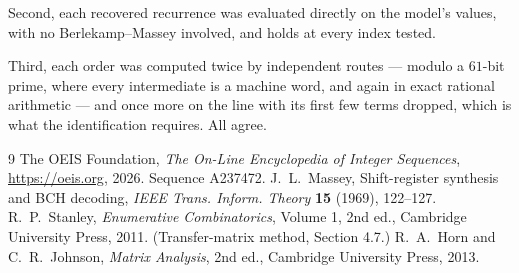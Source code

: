 \documentclass[11pt,a4paper]{article}
\theoremstyle{plain}
\theoremstyle{definition}
\begin{document}
Second, each recovered recurrence was evaluated directly on the model's values, with no
Berlekamp--Massey involved, and holds at every index tested.

Third, each order was computed twice by independent routes --- modulo a $61$-bit prime, where
every intermediate is a machine word, and again in exact rational arithmetic --- and once more
on the line with its first few terms dropped, which is what the identification requires. All
agree.

\begin{thebibliography}{9}
 The OEIS Foundation, \emph{The On-Line Encyclopedia of Integer
Sequences}, \url{https://oeis.org}, 2026. Sequence A237472.
 J.~L.~Massey, Shift-register synthesis and BCH decoding, \emph{IEEE
Trans. Inform. Theory} \textbf{15} (1969), 122--127.
 R.~P.~Stanley, \emph{Enumerative Combinatorics}, Volume 1, 2nd ed.,
Cambridge University Press, 2011. (Transfer-matrix method, Section 4.7.)
 R.~A.~Horn and C.~R.~Johnson, \emph{Matrix Analysis}, 2nd ed., Cambridge
University Press, 2013.
\end{thebibliography}
\end{document}
